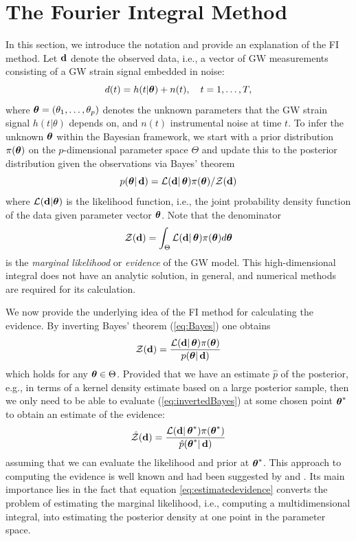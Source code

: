 \documentclass[%
 reprint,
 amsmath,amssymb,
 aps,
]{revtex4-2}
\renewcommand{\d}{{\bf d}}
\newcommand{\btheta}{\mbox{\boldmath $\theta$}}
\begin{document}
\section{\label{sec:FI derivation} The Fourier Integral Method}
In this section, we introduce the notation and provide an explanation of the FI method. Let $\d$ denote the observed data, i.e., a vector of GW measurements consisting of a GW strain signal embedded in noise:
\[d(t)=h(t|\btheta) + n(t),\quad t=1,\ldots,T, \]
where $\btheta=(\theta_1,\ldots,\theta_p)$ denotes the unknown parameters  that the GW strain signal $h(t|\theta)$ depends on, and $n(t)$ instrumental noise at time $t$.
To infer the unknown $\btheta$ within the Bayesian framework, we start with a prior distribution $\pi(\btheta)$ on the $p$-dimensional parameter space $\Theta$ and update this to the posterior distribution given the observations via Bayes' theorem
\begin{equation}\label{eq:Bayes}
  p(\btheta|\,\d)=\mathcal{L}(\d|\,\btheta) \pi(\btheta) / \mathcal{Z}(\d)
 \end{equation}
where $\mathcal{L}(\d|\btheta)$ is the likelihood function, i.e., the joint probability density function of the data given parameter vector $\btheta$. Note that the denominator \[\mathcal{Z}(\d)=\int_{\Theta} \mathcal{L}(\d|\,\btheta) \pi(\btheta) d\btheta\]
is the {\em marginal likelihood} or {\em evidence} of the GW model. This high-dimensional integral does not have an analytic
solution, in general, and numerical methods are required
for its calculation.

We now provide the underlying idea of the FI method for calculating the evidence. By inverting Bayes' theorem (\ref{eq:Bayes}) one obtains
\begin{equation} \label{eq:invertedBayes}
 \mathcal{Z}(\d) = \frac{\mathcal{L}(\d|\,\btheta) \pi(\btheta)}{p(\btheta|\,\d)}
 \end{equation}
which holds for any $\btheta\in \Theta$.
Provided that we have an estimate $\hat{p}$ of the posterior, e.g., in terms of a kernel density estimate based on a large posterior sample, then we only need to be able to evaluate (\ref{eq:invertedBayes}) at some chosen point $\btheta^*$ to obtain an estimate of the evidence:
\begin{equation}\label{eq:estimatedevidence}
\hat{\mathcal{Z}}(\d) =  \frac{\mathcal{L}(\d|\,\btheta^*) \pi(\btheta^*)}{\hat{p}(\btheta^*|\,\d)}
\end{equation}
assuming that we can evaluate the likelihood and prior at $\btheta^*$.
This approach to computing the evidence is well known and had been suggested by \cite{chib1995marginal} and \cite{chib2001marginal}. Its main importance lies in the fact that equation \eqref{eq:estimatedevidence} converts the problem of estimating the marginal likelihood, i.e., computing a multidimensional integral, into estimating the posterior density at one point in the parameter space.
\end{document}
